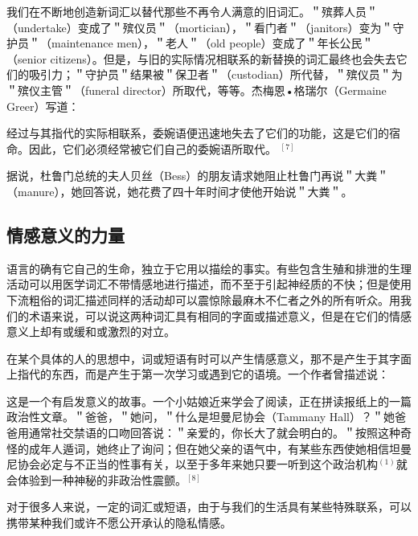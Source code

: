 我们在不断地创造新词汇以替代那些不再令人满意的旧词汇。＂殡葬人员＂（undertake）变成了＂殡仪员＂（mortician），＂看门者＂（janitors）变为＂守护员＂（maintenance men），＂老人＂（old people）变成了＂年长公民＂（senior citizens）。但是，与旧的实际情况相联系的新替换的词汇最终也会失去它们的吸引力；＂守护员＂结果被＂保卫者＂（custodian）所代替，＂殡仪员＂为＂殡仪主管＂（funeral director）所取代，等等。杰梅恩•格瑞尔（Germaine Greer）写道：

\begin{displayquote}
经过与其指代的实际相联系，委婉语便迅速地失去了它们的功能，这是它们的宿命。因此，它们必须经常被它们自己的委婉语所取代。 $^{[7]}$
\end{displayquote}

据说，杜鲁门总统的夫人贝丝（Bess）的朋友请求她阻止杜鲁门再说＂大粪＂（manure），她回答说，她花费了四十年时间才使他开始说＂大粪＂。

\subsection{情感意义的力量}

语言的确有它自己的生命，独立于它用以描绘的事实。有些包含生殖和排泄的生理活动可以用医学词汇不带情感地进行描述，而不至于引起神经质的不快；但是使用下流粗俗的词汇描述同样的活动却可以震惊除最麻木不仁者之外的所有听众。用我们的术语来说，可以说这两种词汇具有相同的字面或描述意义，但是在它们的情感意义上却有或缓和或激烈的对立。

在某个具体的人的思想中，词或短语有时可以产生情感意义，那不是产生于其字面上指代的东西，而是产生于第一次学习或遇到它的语境。一个作者曾描述说：

\begin{displayquote}
这是一个有启发意义的故事。一个小姑娘近来学会了阅读，正在拼读报纸上的一篇政治性文章。＂爸爸，＂她问，＂什么是坦曼尼协会（Tammany Hall）？＂她爸爸用通常社交禁语的口吻回答说：＂亲爱的，你长大了就会明白的。＂按照这种奇怪的成年人遁词，她终止了询问；但在她父亲的语气中，有某些东西使她相信坦曼尼协会必定与不正当的性事有关，以至于多年来她只要一听到这个政治机构$^{(1)}$就会体验到一种神秘的非政治性震颤。$^{[8]}$
\end{displayquote}

对于很多人来说，一定的词汇或短语，由于与我们的生活具有某些特殊联系，可以携带某种我们或许不愿公开承认的隐私情感。


